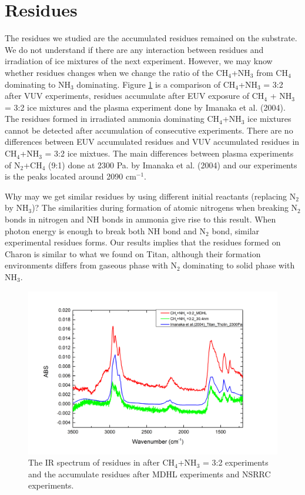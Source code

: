 \section{Residues}
The residues we studied are the accumulated residues remained on the substrate. We do not understand if there are any interaction between residues and irradiation of ice mixtures of the next experiment. However, we may know whether residues changes when we change the ratio of the CH$_4$+NH$_3$ from CH$_4$ dominating to NH$_3$ dominating.  Figure \ref{fig:residues} is a comparison of CH$_4$+NH$_3$ = 3:2 after VUV experiments, residues accumulate after EUV exposure of CH$_4$ + NH$_3$ = 3:2 ice mixtures and the plasma experiment done by Imanaka et al. (2004)\cite{imanaka2004laboratory}. The residues formed in irradiated ammonia dominating CH$_4$+NH$_3$ ice mixtures cannot be detected after accumulation of consecutive experiments. There are no differences between EUV accumulated residues and VUV accumulated residues in CH$_4$+NH$_3$ = 3:2 ice mixtues. The main differences between plasma experiments of N$_2$+CH$_4$ (9:1) done at 2300 Pa. by Imanaka et al. (2004)\cite{imanaka2004laboratory} and our experiments is the peaks located around 2090 cm$^{-1}$.

Why may we get similar residues by using different initial reactants (replacing N$_2$ by NH$_3$)? The similarities during formation of atomic nitrogens when breaking N$_2$ bonds in nitrogen and NH bonds in ammonia give rise to this result. When photon energy is enough to break both NH bond and N$_2$ bond, similar experimental residues forms. Our results implies that the residues formed on Charon is similar to what we found on Titan, although their formation environments differs from gaseous phase with N$_2$ dominating to solid phase with NH$_3$.


\begin{figure}
\centering
\includegraphics[width=\textwidth]{figures/chapter3/residues.png}
\caption{The IR spectrum of residues in after CH$_4$+NH$_3$ = 3:2 experiments and the accumulate residues after MDHL experiments and NSRRC experiments.}
\label{fig:residues}
\end{figure}


